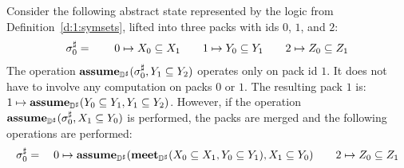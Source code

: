 \begin{example}
Consider the following abstract state represented by the logic from Definition~\ref{d:1:symsets}, lifted into three packs with ids $0$, $1$, and $2$:
\begin{align*}
  {\sigma}^{\sharp}_0 = \qquad 0 \mapsto X_0 \subseteq X_1 \qquad 1 \mapsto Y_0 \subseteq Y_1 \qquad 2 \mapsto Z_0 \subseteq Z_1
\end{align*}
The operation $\textbf{assume}_{{\mathbb{D}}^{\sharp}}({\sigma}^{\sharp}_0, Y_1 \subseteq Y_2)$ operates only on pack id $1$.  It does not have to involve any computation on packs $0$ or $1$.  The resulting pack $1$ is: $1 \mapsto \textbf{assume}_{{\mathbb{D}}^{\sharp}}(Y_0 \subseteq Y_1, Y_1 \subseteq Y_2)$.  However, if the operation $\textbf{assume}_{{\mathbb{D}}^{\sharp}}({\sigma}^{\sharp}_0, X_1 \subseteq Y_0)$ is performed, the packs are merged and the following operations are performed:
\begin{align*}
{\sigma}^{\sharp}_0 = \quad 0 \mapsto \textbf{assume}_{{\mathbb{D}}^{\sharp}}(\textbf{meet}_{{\mathbb{D}}^{\sharp}}(X_0 \subseteq X_1, Y_0 \subseteq Y_1), X_1 \subseteq Y_0) \qquad 2 \mapsto Z_0 \subseteq Z_1
\end{align*}
\end{example}